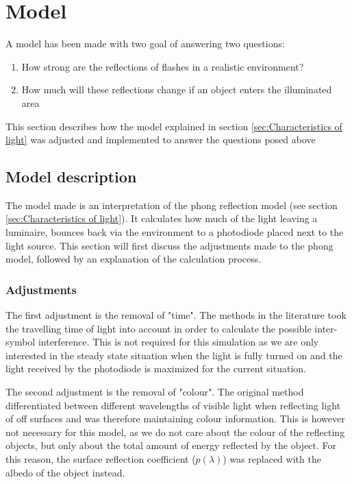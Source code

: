 \chapter{Model}
\label{Model}


A model has been made with two goal of answering two questions:
\begin{enumerate}\itemsep2pt
	\item How strong are the reflections of flashes in a realistic environment?
	\item How much will these reflections change if an object enters the illuminated area
\end{enumerate}
This section describes how the model explained in section \ref{sec:Characteristics of light} was adjusted and implemented to answer the questions posed above

\section{Model description}
The model made is an interpretation of the phong reflection model (see section \ref{sec:Characteristics of light}). It calculates how much of the light leaving a luminaire, bounces back via the environment to a photodiode placed next to the light source. This section will first discuss the adjustments made to the phong model, followed by an explanation of the calculation process.

\subsection{Adjustments}
The first adjustment is the removal of "time". The methods in the literature took the travelling time of light into account in order to calculate the possible inter-symbol interference. This is not required for this simulation as we are only interested in the steady state situation when the light is fully turned on and the light received by the photodiode is maximized for the current situation.

The second adjustment is the removal of "colour". The original method differentiated between different wavelengths of visible light when reflecting light of off surfaces and was therefore maintaining colour information. This is however not necessary for this model, as we do not care about the colour of the reflecting objects, but only about the total amount of energy reflected by the object. For this reason, the surface reflection coefficient ($p(\lambda)$) was replaced with the albedo of the object instead.

